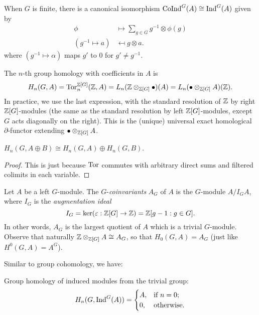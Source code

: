 \documentclass[11pt]{amsart}
\begin{document}
\begin{lem}
    When $G$ is finite, there is a canonical isomorphism $\operatorname{CoInd}^G(A) \cong \operatorname{Ind}^G(A)$ given by
    \begin{align*}
        \phi &\mapsto \sum_{g\in G} g^{-1}\otimes \phi(g) \\
        (g^{-1}\mapsto a) &\mapsfrom g\otimes a.
    \end{align*}
    where $(g^{-1}\mapsto \alpha)$ maps $g'$ to 0 for $g'\neq g^{-1}$.
\end{lem}

\begin{defn}
    The $n$-th group homology with coefficients in $A$ is 
    \[H_n(G,A) = \operatorname{Tor}_n^{\mathbb{Z}[G]}(\mathbb{Z}, A) = L_n(\mathbb{Z}\otimes_{\mathbb{Z}[G]} \bullet)(A) = L_n(\bullet\otimes_{\mathbb{Z}[G]} A)(\mathbb{Z}).\]
    In practice, we use the last expression, with the standard resolution of $\mathbb{Z}$ by right $\mathbb{Z}[G]$-modules (the same as the standard resolution by left $\mathbb{Z}[G]$-modules, except $G$ acts diagonally on the right). This is the (unique) universal exact homological $\partial$-functor extending $\bullet\otimes_{\mathbb{Z}[G]} A$.
\end{defn}

\begin{lem}
    $H_n(G,A\oplus B) \cong H_n(G,A) \oplus H_n(G,B)$.
\end{lem}

\begin{proof}
    This is just because $\operatorname{Tor}$ commutes with arbitrary direct sums and filtered colimits in each variable.
\end{proof}

\begin{defn}[coinvariants]
    Let $A$ be a left $G$-module. The $G$-\emph{coinvariants} $A_G$ of $A$ is the $G$-module $A/I_GA$, where $I_G$ is the \emph{augmentation ideal}
    \[I_G = \ker(\varepsilon: \mathbb{Z}[G] \to \mathbb{Z}) = \mathbb{Z}[g-1: g\in G].\]
    In other words, $A_G$ is the largest quotient of $A$ which is a trivial $G$-module. Observe that naturally $\mathbb{Z}\otimes_{\mathbb{Z}[G]}A \cong A_G$, so that $H_0(G,A) = A_G$ (just like $H^0(G,A) = A^G$).
\end{defn}

Similar to group cohomology, we have:

\begin{lem}
    Group homology of induced modules from the trivial group:
    \[H_n(G,\operatorname{Ind}^G(A)) = 
    \begin{cases}
    A, & \text{if } n = 0; \\
    0, & \text{otherwise.}
    \end{cases}\]
\end{lem}
\end{document}
